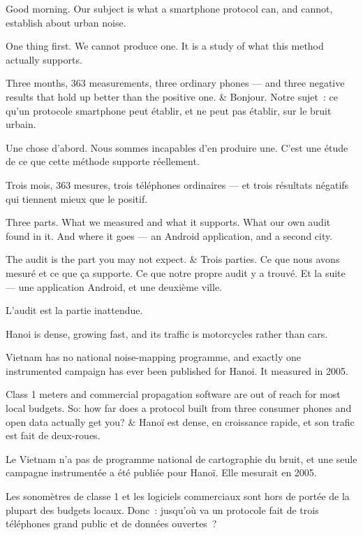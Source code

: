 \documentclass[10pt,a4paper]{article}
\begin{document}
\begin{say}
Good morning. Our subject is what a smartphone protocol can, and cannot,
establish about urban noise.

One thing first.  We cannot produce one.
It is a study of what this method actually supports.

Three months, 363 measurements, three ordinary phones --- and three negative
results that hold up better than the positive one.
&
Bonjour. Notre sujet~: ce qu'un protocole smartphone peut établir, et ne peut pas
établir, sur le bruit urbain.

Une chose d'abord.  Nous sommes
incapables d'en produire une. C'est une étude de ce que cette méthode supporte
réellement.

Trois mois, 363 mesures, trois téléphones ordinaires --- et trois résultats
négatifs qui tiennent mieux que le positif.
\end{say}

\begin{say}
Three parts. What we measured and what it supports. What our own audit found in
it. And where it goes --- an Android application, and a second city.

The audit is the part you may not expect. 
&
Trois parties. Ce que nous avons mesuré et ce que ça supporte. Ce que notre
propre audit y a trouvé. Et la suite --- une application Android, et une deuxième
ville.

L'audit est la partie inattendue. 
\end{say}

\begin{say}
Hanoi is dense, growing fast, and its traffic is motorcycles rather than cars.

Vietnam has no national noise-mapping programme, and exactly one instrumented
campaign has ever been published for Hanoi. It measured in 2005.

Class 1 meters and commercial propagation software are out of reach for most
local budgets. So: how far does a protocol built from three consumer phones and
open data actually get you?
&
Hanoï est dense, en croissance rapide, et son trafic est fait de deux-roues.

Le Vietnam n'a pas de programme national de cartographie du bruit, et une seule
campagne instrumentée a été publiée pour Hanoï. Elle mesurait en 2005.

Les sonomètres de classe 1 et les logiciels commerciaux sont hors de portée de la
plupart des budgets locaux. Donc~: jusqu'où va un protocole fait de trois
téléphones grand public et de données ouvertes~?
\end{say}
\end{document}
